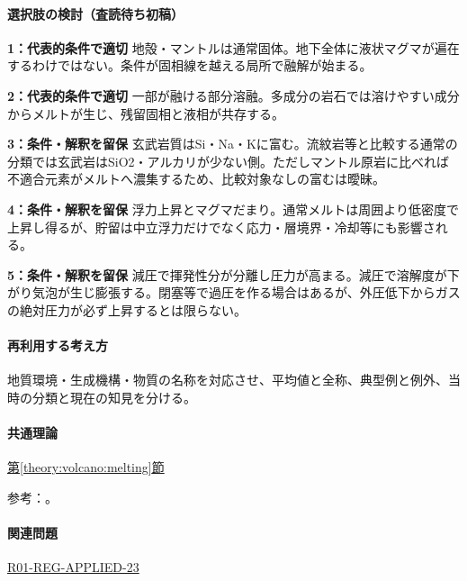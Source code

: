 \paragraph{選択肢の検討（査読待ち初稿）}\mbox{}\par

\noindent\textbf{1：代表的条件で適切} 地殻・マントルは通常固体。地下全体に液状マグマが遍在するわけではない。条件が固相線を越える局所で融解が始まる。\par

\noindent\textbf{2：代表的条件で適切} 一部が融ける部分溶融。多成分の岩石では溶けやすい成分からメルトが生じ、残留固相と液相が共存する。\par

\noindent\textbf{3：条件・解釈を留保} 玄武岩質はSi・Na・Kに富む。流紋岩等と比較する通常の分類では玄武岩はSiO2・アルカリが少ない側。ただしマントル原岩に比べれば不適合元素がメルトへ濃集するため、比較対象なしの富むは曖昧。\par

\noindent\textbf{4：条件・解釈を留保} 浮力上昇とマグマだまり。通常メルトは周囲より低密度で上昇し得るが、貯留は中立浮力だけでなく応力・層境界・冷却等にも影響される。\par

\noindent\textbf{5：条件・解釈を留保} 減圧で揮発性分が分離し圧力が高まる。減圧で溶解度が下がり気泡が生じ膨張する。閉塞等で過圧を作る場合はあるが、外圧低下からガスの絶対圧力が必ず上昇するとは限らない。\par

\paragraph{再利用する考え方} 地質環境・生成機構・物質の名称を対応させ、平均値と全称、典型例と例外、当時の分類と現在の知見を分ける。

\paragraph{共通理論} \hyperref[theory:volcano:melting]{第\ref*{theory:volcano:melting}節}

\par 参考：\cite{vol50_melt_ref,jma_magma1999,vol50_degassing_ref}。

\paragraph{関連問題} \hyperref[q:r01-reg-applied-23]{R01-REG-APPLIED-23}

